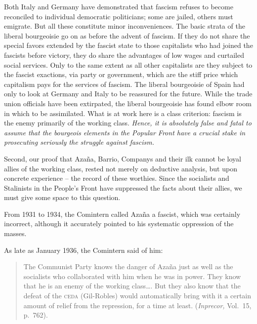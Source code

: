 Both Italy and Germany have demonstrated that fascism refuses to become reconciled to individual democratic politicians; some are jailed, others must emigrate. But all these constitute minor inconveniences. The basic strata of the liberal bourgeoisie go on as before the advent of fascism. If they do not share the special favors extended by the fascist state to those capitalists who had joined the fascists before victory, they do share the advantages of low wages and curtailed social services. Only to the same extent as all other capitalists are they subject to the fascist exactions, via party or government, which are the stiff price which capitalism pays for the services of fascism. The liberal bourgeoisie of Spain had only to look at Germany and Italy to be reassured for the future. While the trade union officials have been extirpated, the liberal bourgeoisie has found elbow room in which to be assimilated.
What is at work here is a class criterion: fascism is the enemy primarily of the working class. \emph{Hence, it is absolutely false and fatal to assume that the bourgeois elements in the Popular Front have a crucial stake in prosecuting seriously the struggle against fascism.}

Second, our proof that Azaña, Barrio, Companys and their ilk cannot be loyal allies of the working class, rested not merely on deductive analysis, but upon concrete experience -- the record of these worthies. Since the socialists and Stalinists in the People’s Front have suppressed the facts about their allies, we must give some space to this question.

From 1931 to 1934, the Comintern called Azaña{\indexMAzana} a fascist, which was certainly incorrect, although it accurately pointed to his systematic oppression of the masses.

As late as January 1936, the Comintern said of him:

\begin{quotation}
  The Communist Party knows the danger of Azaña just as well as the socialists who collaborated with him when he was in power. They know that he is an enemy of the working class\dots. But they also know that the defeat of the \textsc{ceda} (Gil-Robles) would automatically bring with it a certain amount of relief from the repression, for a time at least. (\emph{Inprecor,} Vol.~15, p.~762).
\end{quotation}

